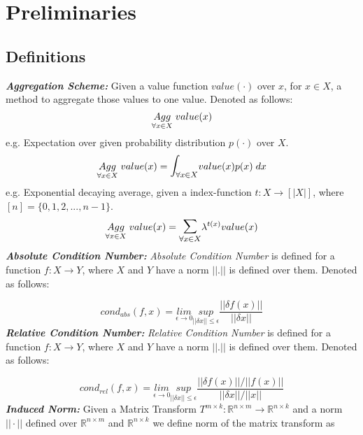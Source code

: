 \section{Preliminaries}
\subsection{Definitions}

\textbf{\textit{Aggregation Scheme:}} Given a value function $value(\cdot)$ over $x$, for $x \in X$, a method to aggregate those values to one value. Denoted as follows:
\begin{equation}
\underset{\forall x\in X}{Agg}\hspace{1mm} value(x)
\end{equation}
e.g. Expectation over given probability distribution $p(\cdot)$ over $X$.
\begin{equation}
\underset{\forall x\in X}{Agg}\hspace{1mm} value(x) = \mathlarger{\mathlarger{\int}}_{\forall x\in X} value(x)p(x)\hspace{1mm}dx
\end{equation}
e.g. Exponential decaying average, given a index-function $t:X\to[|X|]$, where $[n] = \{0,1,2,...,n-1\}$.
\begin{equation}
\underset{\forall x\in X}{Agg}\hspace{1mm} value(x) = \mathlarger{\mathlarger{\sum}}_{\forall x\in X} \lambda^{t(x)}value(x)
\end{equation}
\newline
\textbf{\textit{Absolute Condition Number:}} \textit{Absolute Condition Number} is defined for a function $f: X \to Y$, where $X$ and $Y$ have a norm $||.||$ is defined over them. Denoted as follows:

\begin{equation} \label{def_cond_abs}
cond_{abs}(f,x) = \underset{\epsilon \to 0}{lim}\underset{||\delta x||\le \epsilon}{sup} \frac{||\delta f(x)||}{||\delta x||}
\end{equation}
\newline
\textbf{\textit{Relative Condition Number:}} \textit{Relative Condition Number} is defined for a function $f: X \to Y$, where $X$ and $Y$ have a norm $||.||$ is defined over them. Denoted as follows:

\begin{equation} \label{def_cond_rel}
cond_{rel}(f,x) = \underset{\epsilon \to 0}{lim}\underset{||\delta x||\le \epsilon}{sup} \frac{||\delta f(x)||/||f(x)||}{||\delta x||/||x||}
\end{equation}
\newline
\textbf{\textit{Induced Norm:}} Given a Matrix Transform $T^{m\times k}: \mathbb{R}^{n\times m} \to \mathbb{R}^{n\times k}$ and a norm $||\cdot||$ defined over $\mathbb{R}^{n\times m}$ and $\mathbb{R}^{n\times k}$ we define norm of the matrix transform as 


